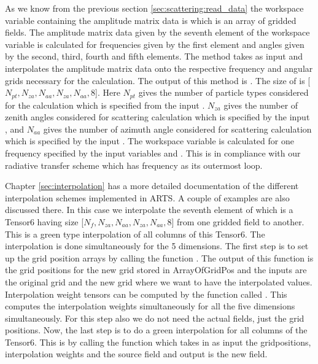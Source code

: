\label{sec:scattering:single_scat_prop}

\label{sec:scattering:gen_ampmat}

As we know from the previous section \ref{sec:scattering:read_data} 
the workspace variable containing the amplitude matrix data is 
 which is an array of gridded
fields. The amplitude matrix data given by the seventh element of the
workspace variable  is calculated for
frequencies given by the first element  and angles given by the
second, third,  fourth and fifth elements.  The method
 takes  as input and
interpolates the amplitude matrix data onto the respective frequency
and angular grids necessary for the calculation.  The output of this
method is .  The size of  is  
[$N_{pt}, N_{za}, N_{aa}, N_{za}, N_{aa}, 8$]. Here $N_{pt}$ gives
the number of particle types considered for the calculation which is
specified from the input . $N_{za}$ gives
the number of zenith angles considered for scattering calculation 
which is specified by the input , and $N_{aa}$
gives the number of azimuth angle considered for scattering
calculation which is specified by the input .
The workspace variable  is calculated for one
frequency specified by the input variables  and
. This is in compliance with our radiative
transfer scheme which has frequency as its outermost loop. 

Chapter \ref{sec:interpolation} has a more
detailed documentation of the different interpolation schemes
implemented in ARTS. A couple of examples are also discussed there.
In this case we interpolate the seventh element of
 which is a Tensor6 having size
[$N_{f}, N_{za}, N_{aa}, N_{za}, N_{aa}, 8$] from one gridded field to
another.  This is a green type interpolation of all columns of this
Tensor6.  The interpolation is done simultaneously for the 5 dimensions.
The first step is to set up the grid position arrays by calling the
function .  The output of this function is the grid
positions for the new grid stored in ArrayOfGridPos and the inputs are
the original grid and the new grid where we want to have the
interpolated values. Interpolation weight tensors can be computed by
the function called .  This computes the
interpolation weights simultaneously for all the five dimensions
simultaneously. For this step also we do not need the actual fields,
just the grid positions. Now, the last step is to do a green
interpolation for all columns of the Tensor6.  This is by calling the
function  which takes in as input the
gridpositions, interpolation weights and the source field and output
is the new field.  


